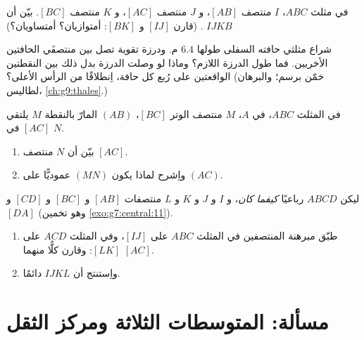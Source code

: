 \begin{exercise}[$\star\star$]\label{exo:g8:midpoints:6}
في مثلث $ABC$، $I$ منتصف $[AB]$، و $J$ منتصف
$[AC]$، و $K$ منتصف $[BC]$. بيّن أن $IJKB$ .
(قارن $[IJ]$ و $[BK]$: أمتوازيان؟ أمتساويان؟)
\end{exercise}

\begin{exercise}[$\star\star$]\label{exo:g8:midpoints:7}
شراع مثلثي حافته السفلى طولها $6.4$ م. ودرزة تقوية
تصل بين منتصفَي الحافتين الأخريين. فما طول الدرزة
اللازم؟ وماذا لو وصلت الدرزة بدل ذلك بين النقطتين الواقعتين على
رُبع كل حافة، اِنطلاقًا من الرأس الأعلى؟ (خمّن
برسم؛ والبرهان لطاليس، \cref{ch:g9:thales}.)
\end{exercise}

\begin{exercise}[$\star\star$]\label{exo:g8:midpoints:8}
في المثلث $ABC$،  في $A$، $M$ منتصف
الوتر $[BC]$،   $(AB)$ المارّ بالنقطة $M$ يلتقي
$[AC]$ في $N$.
\begin{enumerate}
  \item بيّن أن $N$ منتصف $[AC]$.
  \item واِشرح لماذا يكون $(MN)$ عموديًّا على $(AC)$.
\end{enumerate}
\end{exercise}

\begin{exercise}[$\star\star\star$]\label{exo:g8:midpoints:9}
ليكن $ABCD$ رباعيًا \emph{كيفما كان}، و $I$ و $J$ و $K$ و $L$
منتصفات $[AB]$ و $[BC]$ و $[CD]$ و $[DA]$ (وهو تخمين
\cref{exo:g7:central:11}).
\begin{enumerate}
  \item طبّق مبرهنة المنتصفين في المثلث $ABC$ على
         $[IJ]$، وفي المثلث $ACD$ على 
        $[LK]$: وقارن كلًّا منهما  $[AC]$.
  \item واِستنتج أن $IJKL$  دائمًا.
\end{enumerate}
\end{exercise}

\section{مسألة: المتوسطات الثلاثة ومركز الثقل}

